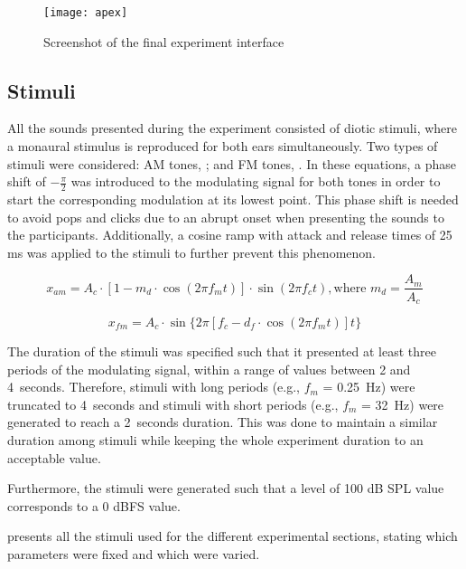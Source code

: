 \documentclass[../main.tex]{subfiles}
\begin{document}
\begin{figure}[!ht]
  \centering
  \texttt{[image: apex]}
  \caption{Screenshot of the final experiment interface}
\label{fig:apex}
\end{figure}

\subsection{Stimuli}
\label{subsec:pilot_stimuli}

All the sounds presented during the experiment consisted of diotic stimuli,
where a monaural stimulus is reproduced for both ears simultaneously. Two
types of stimuli were considered: \gls{AM} tones, ; and \gls{FM}
tones, . In these equations, a phase shift of $-\frac{\pi}{2}$ was
introduced to the modulating signal for both tones in order to start the
corresponding modulation at its lowest point. This phase shift is needed to
avoid pops and clicks due to an abrupt onset when presenting the sounds to the
participants. Additionally, a cosine ramp with attack and release times of 25 ms
was applied to the stimuli to further prevent this phenomenon.

\begin{equation}
  x_{am} = A_c \cdot [1 - m_d \cdot \cos(2 \pi f_m t)] \cdot \sin(2 \pi f_c t),
 \text{where } m_d = \frac{A_m}{A_c}
  \label{eq:am}
\end{equation}

\begin{equation}
  x_{fm} = A_c \cdot \sin \{2 \pi [f_c - d_f \cdot \cos(2 \pi f_m t)] t \}
  \label{eq:fm}
\end{equation}

The duration of the stimuli was specified such that it presented at least three
periods of the modulating signal, within a range of values between 2 and
4~seconds. Therefore, stimuli with long periods (e.g., $f_m$ = 0.25~Hz) were
truncated to 4~seconds and stimuli with short periods (e.g., $f_m$ = 32~Hz) were
generated to reach a 2~seconds duration. This was done to maintain a similar
duration among stimuli while keeping the whole experiment duration to an
acceptable value.

Furthermore, the stimuli were generated such that a level of 100 dB SPL value
corresponds to a 0 dBFS value.

 presents all the stimuli used for the different
experimental sections, stating which parameters were fixed and which were varied.
\end{document}
